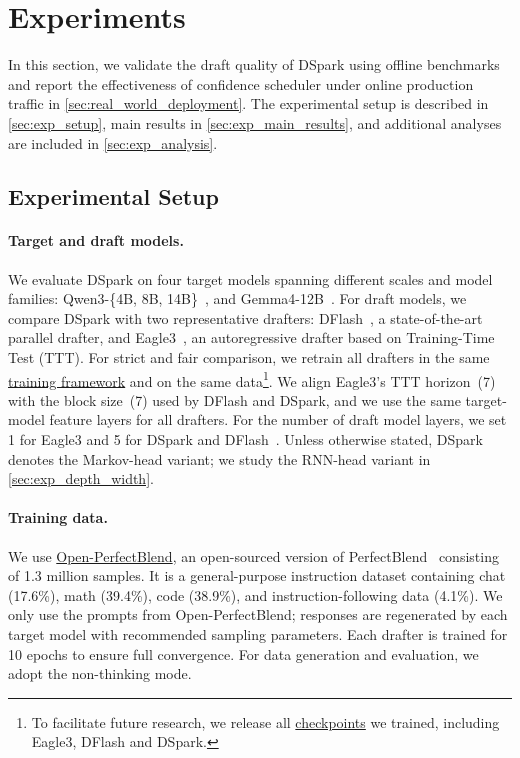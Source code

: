 \section{Experiments}
\label{sec:experiments}
In this section, we validate the draft quality of DSpark using offline benchmarks and report the effectiveness of confidence scheduler under online production traffic in \autoref{sec:real_world_deployment}. The experimental setup is described in \autoref{sec:exp_setup}, main results in \autoref{sec:exp_main_results}, and additional analyses are included in \autoref{sec:exp_analysis}.
\subsection{Experimental Setup}
\label{sec:exp_setup}

\paragraph{Target and draft models.}
We evaluate DSpark on four target models spanning different scales and model families: Qwen3-\{4B, 8B, 14B\}~\citep{yang2025qwen3}, and Gemma4-12B~\citep{gemma4}. 
For draft models, we compare DSpark with two representative drafters: DFlash~\citep{chen2026dflash}, a state-of-the-art parallel drafter, and Eagle3~\citep{li2026eagle}, an autoregressive drafter based on Training-Time Test (TTT).
For strict and fair comparison, we retrain all drafters in the same \href{https://github.com/deepseek-ai/DeepSpec}{training framework} and on the same data\footnote{To facilitate future research, we release all \href{https://huggingface.co/collections/deepseek-ai/deepspec}{checkpoints} we trained, including Eagle3, DFlash and DSpark.}.
We align Eagle3's TTT horizon~(7) with the block size~(7) used by DFlash and DSpark, and we use the same target-model feature layers for all drafters.
For the number of draft model layers, we set 1 for Eagle3 and 5 for DSpark and DFlash~\citep{chen2026dflash}. 
Unless otherwise stated, DSpark denotes the Markov-head variant; we study the RNN-head variant in \autoref{sec:exp_depth_width}.

\paragraph{Training data.}
We use \href{https://huggingface.co/datasets/mlabonne/open-perfectblend}{Open-PerfectBlend}, an open-sourced version of PerfectBlend~\citep{xu2024perfect} consisting of 1.3 million samples. It is a general-purpose instruction dataset containing chat (17.6\%), math (39.4\%), code (38.9\%), and instruction-following data (4.1\%).
We only use the prompts from Open-PerfectBlend; responses are regenerated by each target model with recommended sampling parameters. Each drafter is trained for 10 epochs to ensure full convergence.
For data generation and evaluation, we adopt the non-thinking mode. 

